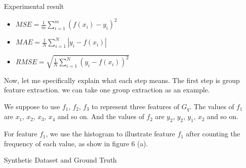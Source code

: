 \documentclass[
 size=14pt,
 paper=smartboard,  %
 mode=present, 		%
 display=slides, 	%
 style=tuliplab,  	%
 pauseslide,
 fleqn,leqno]{powerdot}
\begin{document}


\begin{slide}{Experimental result}

\begin{center}
\begin{itemize}

\item
\smallskip
\large
${MSE = \frac{1}{m}{\sum\limits_{i = 1}^m {\left( {f\left( {{x_i}} \right) - {y_i}} \right)} ^2}}$

\item
${MAE = \frac{1}{N}\sum\limits_{i = 1}^N {\left| {{y_i} - f\left( {{x_i}} \right)} \right|} }$

\item
${RMSE = \sqrt {\frac{1}{N}\sum\limits_{i = 1}^N {{{\left( {{y_i} - f\left( {{x_i}} \right)} \right)}^2}} } }$

\end{itemize}
\end{center}


\begin{note}
Now, let me specifically explain what each step means.
The first step is group feature extraction.
we can take one group extraction as an example.

We suppose to use $f_1$, $f_2$, $f_3$ to represent three features of $G_q$.
The values of $f_1$ are {$x_1$, $x_2$, $x_3$, $x_4$} and so on.
And the values of $f_2$ are {$y_2$, $y_2$, $y_1$, $x_2$} and so on.

For feature $f_1$,
we use the histogram to illustrate feature $f_1$ after
counting the frequency of each value,
as show in figure 6 (a).

\begin{table}
\setlength{\abovecaptionskip}{0pt}
\setlength{\belowcaptionskip}{10pt}
\centering
\caption{Synthetic Dataset and Ground Truth}


\end{table}
\end{note}
\end{slide}
\end{document}
